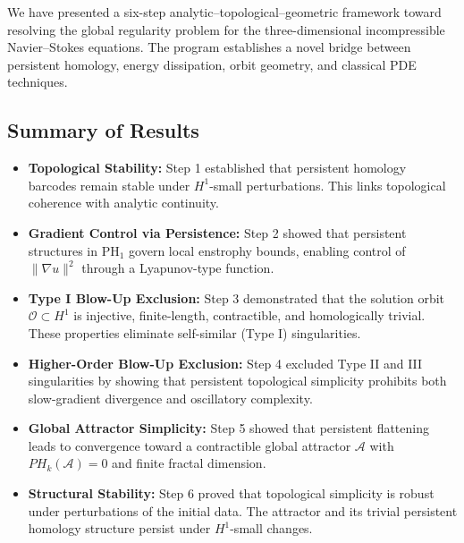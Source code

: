 \documentclass[11pt]{article}
\theoremstyle{definition}
\begin{document}
We have presented a six-step analytic–topological–geometric framework toward resolving the global regularity problem for the three-dimensional incompressible Navier--Stokes equations. The program establishes a novel bridge between persistent homology, energy dissipation, orbit geometry, and classical PDE techniques.

\subsection*{Summary of Results}
\begin{itemize}
  \item \textbf{Topological Stability:} Step 1 established that persistent homology barcodes remain stable under $H^1$-small perturbations. This links topological coherence with analytic continuity.

  \item \textbf{Gradient Control via Persistence:} Step 2 showed that persistent structures in $\mathrm{PH}_1$ govern local enstrophy bounds, enabling control of $\|\nabla u\|^2$ through a Lyapunov-type function.

  \item \textbf{Type I Blow-Up Exclusion:} Step 3 demonstrated that the solution orbit $\mathcal{O} \subset H^1$ is injective, finite-length, contractible, and homologically trivial. These properties eliminate self-similar (Type I) singularities.

  \item \textbf{Higher-Order Blow-Up Exclusion:} Step 4 excluded Type II and III singularities by showing that persistent topological simplicity prohibits both slow-gradient divergence and oscillatory complexity.

  \item \textbf{Global Attractor Simplicity:} Step 5 showed that persistent flattening leads to convergence toward a contractible global attractor $\mathcal{A}$ with $PH_k(\mathcal{A}) = 0$ and finite fractal dimension.

  \item \textbf{Structural Stability:} Step 6 proved that topological simplicity is robust under perturbations of the initial data. The attractor and its trivial persistent homology structure persist under $H^1$-small changes.
\end{itemize}
\end{document}
